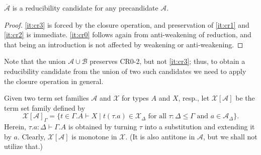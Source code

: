 \documentclass[a4paper,USenglish,cleveref, autoref, thm-restate]{lipics-v2019}
\newcommand{\cl}[1]{\overline{#1}}
\newcommand{\A}{\mathcal{A}}
\newcommand{\B}{\mathcal{B}}
\newcommand{\X}{\mathcal{X}}
\newcommand{\SN}{\mathsf{SN}}
\begin{document}
\begin{lemma}[Saturation]
  $\cl\A$ is a reducibility candidate for any precandidate $\A$.
\end{lemma}
\begin{proof}
  \ref{it:cr3} is forced by the closure operation, and preservation of \ref{it:cr1} and
  \ref{it:cr2} is immediate.
  \ref{it:cr0} follows again from anti-weakening of reduction, and that being
  an introduction is not affected by weakening or anti-weakening.
\end{proof}

Note that the union $\A \cup \B$ preserves CR0-2, but not \ref{it:cr3}; thus,
to obtain a reducibility candidate from the union of two such
candidates we need to apply the closure operation in general.

Given two term set families $\A$ and $\X$ for types $A$ and $X$,
resp., let $\X[\A]$ be the term set family defined by
\[
  \X[\A]_\Gamma =
  \{ t \in \Gamma.A \vdash X
     \mid t(\tau.a) \in \X_\Delta
     \mbox{ for all } \tau : \Delta \leq \Gamma
     \mbox{ and } a \in \A_\Delta
  \}
  .
\]
Herein, $\tau.a : \Delta \vdash \Gamma.A$ is obtained by turning
$\tau$ into a substitution and extending it by $a$.
Clearly, $\X[\A]$ is monotone in $\X$. (It is also antitone in $\A$, but we
shall not utilize that.)
\end{document}
